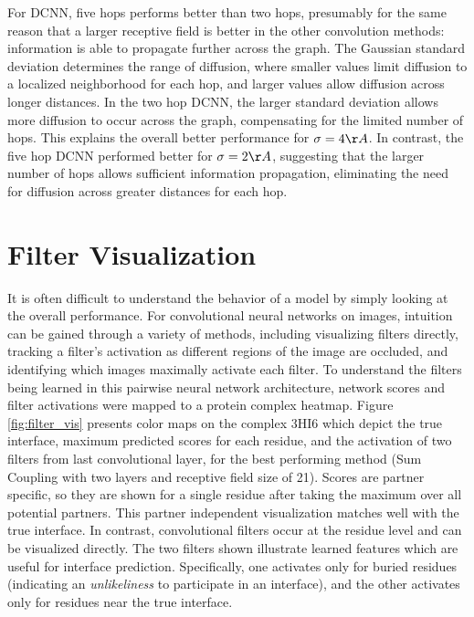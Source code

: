 For DCNN, five hops performs better than two hops, presumably for the same reason that a larger receptive field is better in the other convolution methods: information is able to propagate further across the graph.
The Gaussian standard deviation determines the range of diffusion, where smaller values limit diffusion to a localized neighborhood for each hop, and larger values allow diffusion across longer distances.
In the two hop DCNN, the larger standard deviation allows more diffusion to occur across the graph, compensating for the limited number of hops.
This explains the overall better performance for $\sigma=4\AA{}$.
In contrast, the five hop DCNN performed better for $\sigma=2\AA{}$, suggesting that the larger number of hops allows sufficient information propagation, eliminating the need for diffusion across greater distances for each hop.





\section{Filter Visualization}

It is often difficult to understand the behavior of a model by simply looking at the overall performance. 
For convolutional neural networks on images, intuition can be gained through a variety of methods, including visualizing filters directly, tracking a filter's activation as different regions of the image are occluded, and identifying which images maximally activate each filter. 
To understand the filters being learned in this pairwise neural network architecture, network scores and filter activations were mapped to a protein complex heatmap.
Figure \ref{fig:filter_vis} presents color maps on the complex 3HI6 which depict the true interface, maximum predicted scores for each residue, and the activation of two filters from last convolutional layer, for the best performing method (Sum Coupling with two layers and receptive field size of 21).
Scores are partner specific, so they are shown for a single residue after taking the maximum over all potential partners.
This partner independent visualization matches well with the true interface.
In contrast, convolutional filters occur at the residue level and can be visualized directly. 
The two filters shown illustrate learned features which are useful for interface prediction.
Specifically, one activates only for buried residues (indicating an \emph{unlikeliness} to participate in an interface), and the other activates only for residues near the true interface.

